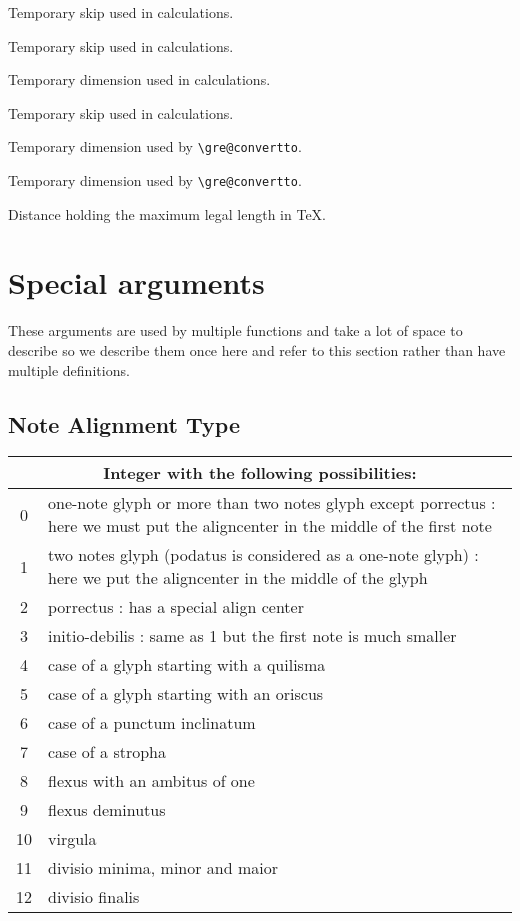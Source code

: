 Temporary skip used in calculations.

Temporary skip used in calculations.

Temporary dimension used in calculations.

Temporary skip used in calculations.

Temporary dimension used by \verb=\gre@convertto=.

Temporary dimension used by \verb=\gre@convertto=.

Distance holding the maximum legal length in TeX.



\section{Special arguments}

These arguments are used by multiple functions and take a lot of space
to describe so we describe them once here and refer to this section
rather than have multiple definitions.

\subsection{Note Alignment Type}\label{notesalign}
\begin{tabular}{cp{}}
  \multicolumn{2}{c}{Integer with the following possibilities:} \\
  \hline
  0 & one-note glyph or more than two notes glyph except porrectus : here we must put the aligncenter in the middle of the first note\\
  1 & two notes glyph (podatus is considered as a one-note glyph) : here we put the aligncenter in the middle of the glyph\\
  2 & porrectus : has a special align center\\
  3 & initio-debilis : same as 1 but the first note is much smaller\\
  4 & case of a glyph starting with a quilisma\\
  5 & case of a glyph starting with an oriscus\\
  6 & case of a punctum inclinatum\\
  7 & case of a stropha\\
  8 & flexus with an ambitus of one\\
  9 & flexus deminutus\\
  10 & virgula\\
  11 & divisio minima, minor and maior\\
  12 & divisio finalis
 \end{tabular}


